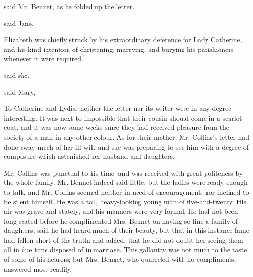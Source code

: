 
 said Mr. Bennet, as he folded up the letter. 


 said Jane, 

Elizabeth was chiefly struck by his extraordinary deference for Lady Catherine, and his kind intention of christening, marrying, and burying his parishioners whenever it were required.

 said she. 


 said Mary, 

To Catherine and Lydia, neither the letter nor its writer were in any degree interesting. It was next to impossible that their cousin should come in a scarlet coat, and it was now some weeks since they had received pleasure from the society of a man in any other colour. As for their mother, Mr. Collins's letter had done away much of her ill-will, and she was preparing to see him with a degree of composure which astonished her husband and daughters.

Mr. Collins was punctual to his time, and was received with great politeness by the whole family. Mr. Bennet indeed said little; but the ladies were ready enough to talk, and Mr. Collins seemed neither in need of encouragement, nor inclined to be silent himself. He was a tall, heavy-looking young man of five-and-twenty. His air was grave and stately, and his manners were very formal. He had not been long seated before he complimented Mrs. Bennet on having so fine a family of daughters; said he had heard much of their beauty, but that in this instance fame had fallen short of the truth; and added, that he did not doubt her seeing them all in due time disposed of in marriage. This gallantry was not much to the taste of some of his hearers; but Mrs. Bennet, who quarreled with no compliments, answered most readily.

